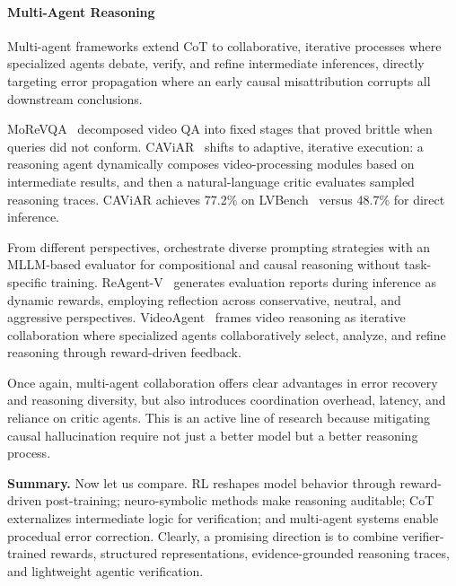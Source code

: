 \documentclass[10pt]{article} %
\begin{document}
\paragraph{Multi-Agent Reasoning}

Multi-agent frameworks extend CoT to collaborative, iterative processes where specialized agents debate, verify, and refine intermediate inferences, directly targeting error propagation where an early causal misattribution corrupts all downstream conclusions.

MoReVQA~\citep{Min2024MoReVQAEM} decomposed video QA into fixed stages that proved brittle when queries did not conform. CAViAR~\citep{Menon2025CAViARCV} shifts to adaptive, iterative execution: a reasoning agent dynamically composes video-processing modules based on intermediate results, and then a natural-language critic evaluates sampled reasoning traces. CAViAR achieves 77.2\% on LVBench~\citep{wang2025lvbench} versus 48.7\% for direct inference. %

From different perspectives, \citet{Xie2025TeamOO} orchestrate diverse prompting strategies with an MLLM-based evaluator for compositional and causal reasoning without task-specific training. ReAgent-V~\citep{Zhou2025ReAgentVAR} generates evaluation reports during inference as dynamic rewards, employing reflection across conservative, neutral, and aggressive perspectives. VideoAgent~\citep{Fan2024VideoAgentAM} frames video reasoning as iterative collaboration where specialized agents collaboratively select, analyze, and refine reasoning through reward-driven feedback.

Once again, multi-agent collaboration offers clear advantages in error recovery and reasoning diversity, but also introduces coordination overhead, latency, and reliance on critic agents. This is an active line of research because mitigating causal hallucination require not just a better model but a better reasoning process.

\textbf{Summary.} Now let us compare. RL reshapes model behavior through reward-driven post-training; neuro-symbolic methods make reasoning auditable; CoT externalizes intermediate logic for verification; and multi-agent systems enable procedual error correction. %
Clearly, a promising direction is to combine verifier-trained rewards, structured representations, evidence-grounded reasoning traces, and lightweight agentic verification.
\end{document}
